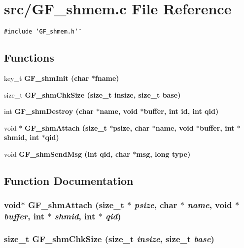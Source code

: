 \section{src/GF\_\-shmem.c File Reference}
\label{GF__shmem_8c}
{\tt \#include \char`\"{}GF\_\-shmem.h\char`\"{}}\par
\subsection*{Functions}
\begin{CompactItemize}
\item 
key\_\-t \bf{GF\_\-shm\-Init} (char $\ast$fname)
\item 
size\_\-t \bf{GF\_\-shm\-Chk\-Size} (size\_\-t insize, size\_\-t base)
\item 
int \bf{GF\_\-shm\-Destroy} (char $\ast$name, void $\ast$buffer, int id, int qid)
\item 
void $\ast$ \bf{GF\_\-shm\-Attach} (size\_\-t $\ast$psize, char $\ast$name, void $\ast$buffer, int $\ast$\bf{shmid}, int $\ast$qid)
\item 
void \bf{GF\_\-shm\-Send\-Msg} (int qid, char $\ast$msg, long type)
\end{CompactItemize}


\subsection{Function Documentation}
\subsubsection{\setlength{\rightskip}{0pt plus 5cm}void$\ast$ GF\_\-shm\-Attach (size\_\-t $\ast$ {\em psize}, char $\ast$ {\em name}, void $\ast$ {\em buffer}, int $\ast$ {\em shmid}, int $\ast$ {\em qid})}\label{GF__shmem_8c_a37edee6aebb1f0e00ea391a47b51456}


\subsubsection{\setlength{\rightskip}{0pt plus 5cm}size\_\-t GF\_\-shm\-Chk\-Size (size\_\-t {\em insize}, size\_\-t {\em base})}\label{GF__shmem_8c_4fc8969a8a240fc732028b2fd86cf2c1}


